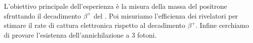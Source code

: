 L'obiettivo principale dell'esperienza è la misura della massa del positrone sfruttando il decadimento $\beta^+$ del \na{}. Poi misuriamo l'efficienza dei rivelatori per stimare il rate di cattura elettronica rispetto al decadimento $\beta^+$. Infine cerchiamo di provare l'esistenza dell'annichilazione a 3 fotoni.